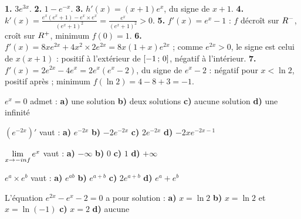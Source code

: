 \begin{corrige}
\textbf{1.} $3e^{3x}$.
\textbf{2.} $1-e^{-x}$.
\textbf{3.} $h'(x) = (x+1)e^{x}$, du signe de $x+1$.
\textbf{4.} $k'(x) = \frac{e^{x}\left(e^{x}+1\right)-e^{x}\times e^{x}}
{\left(e^{x}+1\right)^{2}} = \frac{e^{x}}{\left(e^{x}+1\right)^{2}} > 0$.
\textbf{5.} $f'(x) = e^{x}-1$ : $f$ décroît sur $R^{-}$, croît sur $R^{+}$,
minimum $f(0) = 1$.
\textbf{6.} $f'(x) = 8xe^{2x}+4x^{2}\times2e^{2x} = 8x\left(1+x\right)e^{2x}$ ;
comme $e^{2x}>0$, le signe est celui de $x(x+1)$ : positif à l'extérieur de
$\left[-1\,;\,0\right]$, négatif à l'intérieur.
\textbf{7.} $f'(x) = 2e^{2x}-4e^{x} = 2e^{x}\left(e^{x}-2\right)$, du signe
de $e^{x}-2$ : négatif pour $x<\ln2$, positif après ; minimum
$f(\ln2) = 4-8+3 = -1$.
\end{corrige}

\begin{qcm}
\exo $e^{x} = 0$ admet :
\textbf{a)} une solution \quad \textbf{b)} deux solutions \quad
\textbf{c)} aucune solution \quad \textbf{d)} une infinité 

\exo $\left(e^{-2x}\right)'$ vaut :
\textbf{a)} $e^{-2x}$ \quad \textbf{b)} $-2e^{-2x}$ \quad
\textbf{c)} $2e^{-2x}$ \quad \textbf{d)} $-2xe^{-2x-1}$ 

\exo $\limminf e^{x}$ vaut :
\textbf{a)} $-\infty$ \quad \textbf{b)} $0$ \quad \textbf{c)} $1$ \quad
\textbf{d)} $+\infty$ 

\exo $e^{a}\times e^{b}$ vaut :
\textbf{a)} $e^{ab}$ \quad \textbf{b)} $e^{a+b}$ \quad \textbf{c)}
$2e^{a+b}$ \quad \textbf{d)} $e^{a}+e^{b}$ 

\exo L'équation $e^{2x}-e^{x}-2 = 0$ a pour solution :
\textbf{a)} $x = \ln2$ \quad \textbf{b)} $x = \ln2$ et $x = \ln(-1)$ \quad
\textbf{c)} $x = 2$ \quad \textbf{d)} aucune 
\end{qcm}

